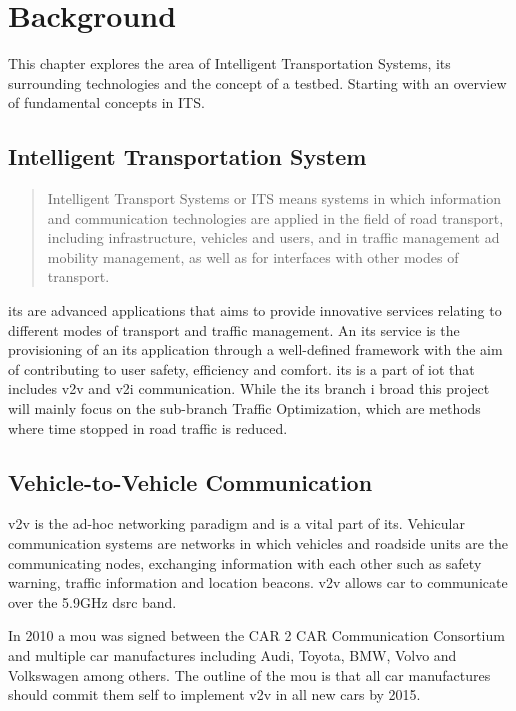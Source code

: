 \chapter{Background}
\label{chp:Background} 

This chapter explores the area of Intelligent Transportation Systems, its surrounding technologies and the concept of a testbed. Starting with an overview of fundamental concepts in ITS.

\section{Intelligent Transportation System}\label{sec:its}

\blockquote[\cite{eu-10-2010}]{
Intelligent Transport Systems or ITS means systems in which information and communication technologies are applied in the field of road transport, including infrastructure, vehicles and users, and in traffic management ad mobility management, as well as for interfaces with other modes of transport.}

\gls{its} are advanced applications that aims to provide innovative services relating to different modes of transport and traffic management. An \gls{its} service is the provisioning of an \gls{its} application through a well-defined framework with the aim of contributing to user safety, efficiency and comfort. \gls{its} is a part of \gls{iot} that includes \gls{v2v} and \gls{v2i} communication. While the \gls{its} branch i broad this project will mainly focus on the sub-branch Traffic Optimization, which are methods where time stopped in road traffic is reduced. 


\section{Vehicle-to-Vehicle Communication}\label{sec:v2v}
\gls{v2v} is the ad-hoc networking paradigm and is a vital part of \gls{its}. Vehicular communication systems are networks in which vehicles and roadside units are the communicating nodes, exchanging information with each other such as safety warning, traffic information and location beacons. \gls{v2v} allows car to communicate over the 5.9GHz \gls{dsrc} band. 

In 2010 a \gls{mou} was signed between the CAR 2 CAR Communication Consortium and multiple car manufactures including Audi, Toyota, BMW, Volvo and Volkswagen among others. The outline of the \gls{mou} is that all car manufactures should commit them self to implement \gls{v2v} in all new cars by 2015. 

